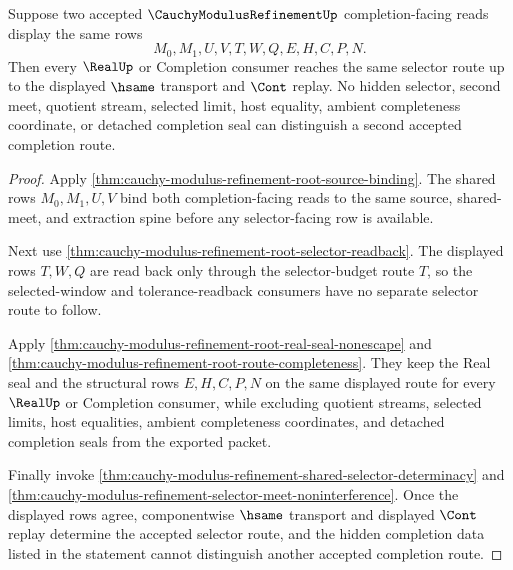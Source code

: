 \begin{theorem}
\label{thm:cauchy-modulus-refinement-completion-consumer-route-determinacy}
Suppose two accepted $\CauchyModulusRefinementUp$ completion-facing reads
display the same rows
$$
M_0,M_1,U,V,T,W,Q,E,H,C,P,N.
$$
Then every $\RealUp$ or Completion consumer reaches the same selector route up
to the displayed $\hsame$ transport and $\Cont$ replay. No hidden selector,
second meet, quotient stream, selected limit, host equality, ambient
completeness coordinate, or detached completion seal can distinguish a second
accepted completion route.
\end{theorem}
\begin{proof}
Apply \autoref{thm:cauchy-modulus-refinement-root-source-binding}. The shared
rows $M_0,M_1,U,V$ bind both completion-facing reads to the same source,
shared-meet, and extraction spine before any selector-facing row is available.

Next use \autoref{thm:cauchy-modulus-refinement-root-selector-readback}. The
displayed rows $T,W,Q$ are read back only through the selector-budget route
$T$, so the selected-window and tolerance-readback consumers have no separate
selector route to follow.

Apply \autoref{thm:cauchy-modulus-refinement-root-real-seal-nonescape} and
\autoref{thm:cauchy-modulus-refinement-root-route-completeness}. They keep the
Real seal and the structural rows $E,H,C,P,N$ on the same displayed route for
every $\RealUp$ or Completion consumer, while excluding quotient streams,
selected limits, host equalities, ambient completeness coordinates, and
detached completion seals from the exported packet.

Finally invoke
\autoref{thm:cauchy-modulus-refinement-shared-selector-determinacy} and
\autoref{thm:cauchy-modulus-refinement-selector-meet-noninterference}. Once the
displayed rows agree, componentwise $\hsame$ transport and displayed $\Cont$
replay determine the accepted selector route, and the hidden completion data
listed in the statement cannot distinguish another accepted completion route.
\end{proof}

